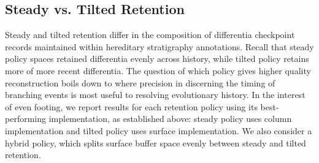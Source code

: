 



\subsection{Steady vs. Tilted Retention} \label{sec:steady-vs-tilted}



Steady and tilted retention differ in the composition of differentia checkpoint records maintained within hereditary stratigraphy annotations.
Recall that steady policy spaces retained differentia evenly across history, while tilted policy retains more of more recent differentia.
The question of which policy gives higher quality reconstruction boils down to where precision in discerning the timing of branching events is most useful to resolving evolutionary history.
In the interest of even footing, we report results for each retention policy using its best-performing implementation, as established above: steady policy uses column implementation and tilted policy uses surface implementation.
We also consider a hybrid policy, which splits surface buffer space evenly between steady and tilted retention.

